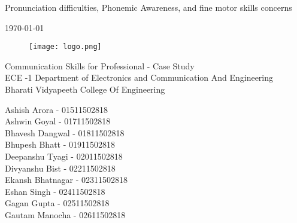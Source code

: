 \begin{titlepage}

\begin{center}

\Huge{Pronunciation difficulties, Phonemic Awareness, and fine motor skills
	concerns}
\vspace{10mm}

\normalsize{\today}


\vspace{10mm}


\begin{figure}[!h]
    \centering
    \texttt{[image: logo.png]}
\end{figure}

\vspace{5mm}

\small{Communication Skills for Professional -  Case Study \\ ECE -1}
\vspace{5mm}
\small{Department of Electronics and Communication And Engineering\\ Bharati Vidyapeeth College Of Engineering\\ }


\begin{multicols}{2}
\small{Ashish Arora - 01511502818} \\
\small{Ashwin Goyal - 01711502818} \\
\small{Bhavesh Dangwal - 01811502818} \\
\small{Bhupesh Bhatt - 01911502818} \\
\small{Deepanshu Tyagi - 02011502818} \\
\small{Divyanshu Bist - 02211502818} \\
\small{Ekansh Bhatnagar - 02311502818} \\
\small{Eshan Singh - 02411502818} \\
\small{Gagan Gupta - 02511502818} \\
\small{Gautam Manocha - 02611502818} \\
\end{multicols}

\end{center}

\end{titlepage}
